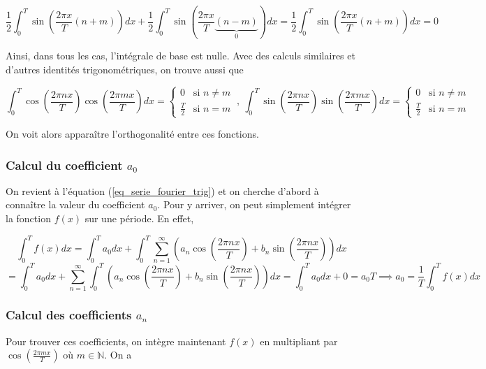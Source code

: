 \begin{equation*}
    \frac{1}{2}\int_{0}^{T}\sin\left(\frac{2\pi x}{T}(n+m)\right)dx + \frac{1}{2}\int_{0}^{T}\sin\left(\frac{2\pi x}{T}\underbrace{(n-m)}_\text{0}\right)dx = \frac{1}{2}\int_{0}^{T}\sin\left(\frac{2\pi x}{T}(n+m)\right)dx = 0 
\end{equation*}

Ainsi, dans tous les cas, l'intégrale de base est nulle. Avec des calculs similaires et d'autres identités trigonométriques, on trouve aussi que 

\begin{equation*}
    \int_{0}^{T}\cos(\frac{2\pi nx}{T})\cos(\frac{2\pi mx}{T})dx = \begin{cases}
        0 & \text{si $n \neq m$}\\
        \frac{T}{2} & \text{si $n = m$}
      \end{cases}\ , \ \int_{0}^{T}\sin(\frac{2\pi nx}{T})\sin(\frac{2\pi mx}{T})dx = \begin{cases}
        0 & \text{si $n \neq m$}\\
        \frac{T}{2} & \text{si $n = m$}
      \end{cases}     
\end{equation*}

On voit alors apparaître l'orthogonalité entre ces fonctions.

\subsubsection{Calcul du coefficient $a_0$}
On revient à l'équation (\ref{eq_serie_fourier_trig}) et on cherche d'abord à connaître la valeur du coefficient $a_0$. Pour y arriver, on peut simplement intégrer la fonction $f(x)$ sur une période. En effet,

\begin{equation*}
    \int_{0}^{T}f(x)dx = \int_{0}^{T}a_0 dx + \int_{0}^{T}\sum_{n=1}^{\infty}\left(a_n\cos(\frac{2\pi n x}{T}) + b_n\sin(\frac{2\pi n x}{T})\right)dx
\end{equation*}
\begin{equation*}
    = \int_{0}^{T}a_0 dx + \sum_{n=1}^{\infty}\int_{0}^{T}\left(a_n\cos(\frac{2\pi n x}{T}) + b_n\sin(\frac{2\pi n x}{T})\right)dx = \int_{0}^{T}a_0 dx + 0 = a_0T \implies a_0 = \frac{1}{T}\int_{0}^{T}f(x)dx
\end{equation*}

\subsubsection{Calcul des coefficients $a_n$}
Pour trouver ces coefficients, on intègre maintenant $f(x)$ en multipliant par $\cos(\frac{2\pi mx}{T})$ où $m \in  \mathbb{N}$. On a

